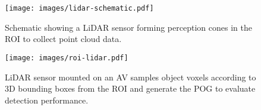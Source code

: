 \documentclass[10pt,twocolumn,letterpaper]{article}
\begin{document}
\begin{figure}[t!]
\begin{center}
 \texttt{[image: images/lidar-schematic.pdf]}
\end{center}
\vspace*{-5mm}
  \caption{Schematic showing a LiDAR sensor forming perception cones in the ROI to collect point cloud data.}
\label{fig:lidar-schematic}
\end{figure}

\begin{figure}[t!]
\begin{center}
 \texttt{[image: images/roi-lidar.pdf]}
\end{center}
\vspace*{-12mm}
  \caption{LiDAR sensor mounted on an AV samples object voxels according to 3D bounding boxes from the ROI and generate the POG to evaluate detection performance. }
\label{fig:roi-lidar}
\vspace{-4mm}
\end{figure}
\end{document}
